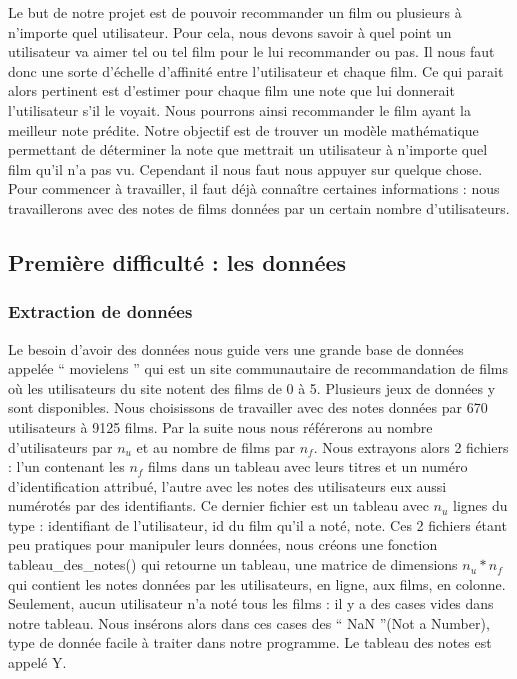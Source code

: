 \documentclass[a4paper,10pt]{article}
\begin{document}
Le but de notre projet est de pouvoir recommander un film ou plusieurs à n'importe quel utilisateur. 
Pour cela, nous devons savoir à quel point un utilisateur va aimer tel ou tel film pour le lui recommander ou pas. 
Il nous faut donc une sorte d'échelle d'affinité entre l'utilisateur et chaque film. Ce qui parait alors pertinent est d'estimer pour chaque film une note que lui donnerait l'utilisateur s'il le voyait. 
Nous pourrons ainsi recommander le film ayant la meilleur note prédite.
Notre objectif est de trouver un modèle mathématique permettant de déterminer la note que mettrait un utilisateur à n'importe quel film qu'il n'a pas vu. Cependant il nous faut nous appuyer sur quelque chose. Pour commencer à travailler, il faut déjà connaître certaines informations : nous travaillerons avec des notes de films données par un certain nombre d'utilisateurs.

\subsection{Première difficulté : les données}
\subsubsection{Extraction de données}

Le besoin d'avoir des données nous guide vers une grande base de données appelée `` movielens '' qui est un site communautaire de recommandation de films où les utilisateurs du site notent des films de 0 à 5.
Plusieurs jeux de données y sont disponibles. 
Nous choisissons de travailler avec des notes données par 670 utilisateurs à 9125 films.
Par la suite nous nous référerons au nombre d'utilisateurs par $n_u$ et au nombre de films par $n_f$.
Nous extrayons alors 2 fichiers : l’un contenant les $n_f$ films dans un tableau avec leurs titres et un numéro d'identification attribué, 
l’autre avec les notes des utilisateurs eux aussi numérotés par des identifiants.
Ce dernier fichier est un tableau avec $n_u$ lignes du type : identifiant de l’utilisateur, id du film qu’il a noté, note. 
Ces 2 fichiers étant peu pratiques pour manipuler leurs données,  
nous créons une fonction tableau\_des\_notes() qui retourne un tableau, une matrice de dimensions $n_u * n_f$ qui contient les notes données par les utilisateurs, en ligne, aux films, en colonne. Seulement, aucun utilisateur n'a noté tous les films : il y a des cases vides dans notre tableau. Nous insérons alors dans ces cases des `` NaN ''(Not a Number), type de donnée facile à traiter dans notre programme.
Le tableau des notes est appelé Y.
\end{document}
